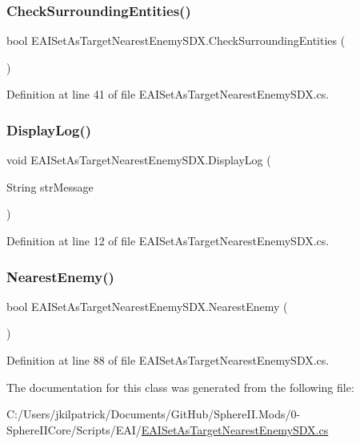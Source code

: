 \subsubsection{\texorpdfstring{CheckSurroundingEntities()}{CheckSurroundingEntities()}}
{\footnotesize\ttfamily bool E\+A\+I\+Set\+As\+Target\+Nearest\+Enemy\+S\+D\+X.\+Check\+Surrounding\+Entities (\begin{DoxyParamCaption}{ }\end{DoxyParamCaption})}



Definition at line 41 of file E\+A\+I\+Set\+As\+Target\+Nearest\+Enemy\+S\+D\+X.\+cs.

\mbox{\label{class_e_a_i_set_as_target_nearest_enemy_s_d_x_a628fcb008c20c6a59f8663fb57c719fe}} 
\subsubsection{\texorpdfstring{DisplayLog()}{DisplayLog()}}
{\footnotesize\ttfamily void E\+A\+I\+Set\+As\+Target\+Nearest\+Enemy\+S\+D\+X.\+Display\+Log (\begin{DoxyParamCaption}\item[{String}]{str\+Message }\end{DoxyParamCaption})}



Definition at line 12 of file E\+A\+I\+Set\+As\+Target\+Nearest\+Enemy\+S\+D\+X.\+cs.

\mbox{\label{class_e_a_i_set_as_target_nearest_enemy_s_d_x_a7a78d543de832cbace9a0a7d0c7b0cdd}} 
\subsubsection{\texorpdfstring{NearestEnemy()}{NearestEnemy()}}
{\footnotesize\ttfamily bool E\+A\+I\+Set\+As\+Target\+Nearest\+Enemy\+S\+D\+X.\+Nearest\+Enemy (\begin{DoxyParamCaption}{ }\end{DoxyParamCaption})}



Definition at line 88 of file E\+A\+I\+Set\+As\+Target\+Nearest\+Enemy\+S\+D\+X.\+cs.



The documentation for this class was generated from the following file\+:\begin{DoxyCompactItemize}
\item 
C\+:/\+Users/jkilpatrick/\+Documents/\+Git\+Hub/\+Sphere\+I\+I.\+Mods/0-\/\+Sphere\+I\+I\+Core/\+Scripts/\+E\+A\+I/\mbox{\hyperlink{_e_a_i_set_as_target_nearest_enemy_s_d_x_8cs}{E\+A\+I\+Set\+As\+Target\+Nearest\+Enemy\+S\+D\+X.\+cs}}\end{DoxyCompactItemize}
